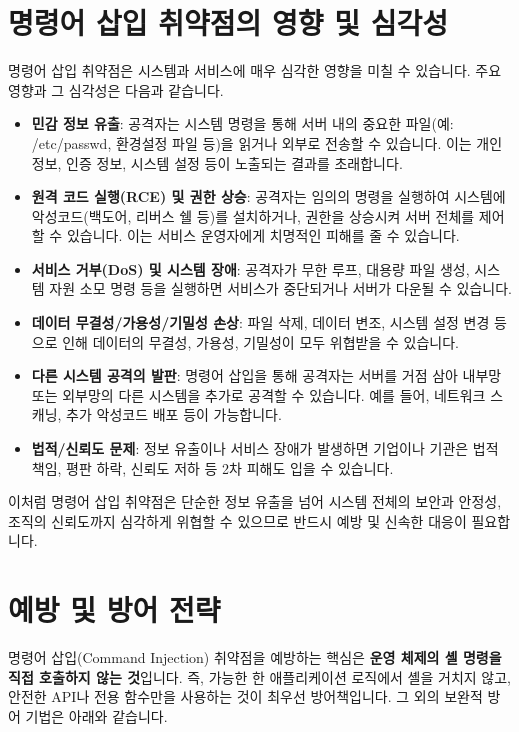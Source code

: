 \documentclass{article}
\begin{document}
\section*{명령어 삽입 취약점의 영향 및 심각성}

명령어 삽입 취약점은 시스템과 서비스에 매우 심각한 영향을 미칠 수 있습니다. 주요 영향과 그 심각성은 다음과 같습니다.

\begin{itemize}
  \item \textbf{민감 정보 유출}: 공격자는 시스템 명령을 통해 서버 내의 중요한 파일(예: /etc/passwd, 환경설정 파일 등)을 읽거나 외부로 전송할 수 있습니다. 이는 개인정보, 인증 정보, 시스템 설정 등이 노출되는 결과를 초래합니다.
  \item \textbf{원격 코드 실행(RCE) 및 권한 상승}: 공격자는 임의의 명령을 실행하여 시스템에 악성코드(백도어, 리버스 쉘 등)를 설치하거나, 권한을 상승시켜 서버 전체를 제어할 수 있습니다. 이는 서비스 운영자에게 치명적인 피해를 줄 수 있습니다.
  \item \textbf{서비스 거부(DoS) 및 시스템 장애}: 공격자가 무한 루프, 대용량 파일 생성, 시스템 자원 소모 명령 등을 실행하면 서비스가 중단되거나 서버가 다운될 수 있습니다.
  \item \textbf{데이터 무결성/가용성/기밀성 손상}: 파일 삭제, 데이터 변조, 시스템 설정 변경 등으로 인해 데이터의 무결성, 가용성, 기밀성이 모두 위협받을 수 있습니다.
  \item \textbf{다른 시스템 공격의 발판}: 명령어 삽입을 통해 공격자는 서버를 거점 삼아 내부망 또는 외부망의 다른 시스템을 추가로 공격할 수 있습니다. 예를 들어, 네트워크 스캐닝, 추가 악성코드 배포 등이 가능합니다.
  \item \textbf{법적/신뢰도 문제}: 정보 유출이나 서비스 장애가 발생하면 기업이나 기관은 법적 책임, 평판 하락, 신뢰도 저하 등 2차 피해도 입을 수 있습니다.
\end{itemize}

이처럼 명령어 삽입 취약점은 단순한 정보 유출을 넘어 시스템 전체의 보안과 안정성, 조직의 신뢰도까지 심각하게 위협할 수 있으므로 반드시 예방 및 신속한 대응이 필요합니다.

\section*{예방 및 방어 전략}
명령어 삽입(Command Injection) 취약점을 예방하는 핵심은 \textbf{운영 체제의 셸 명령을 직접 호출하지 않는 것}입니다.  
즉, 가능한 한 애플리케이션 로직에서 셸을 거치지 않고, 안전한 API나 전용 함수만을 사용하는 것이 최우선 방어책입니다.  
그 외의 보완적 방어 기법은 아래와 같습니다.
\end{document}
